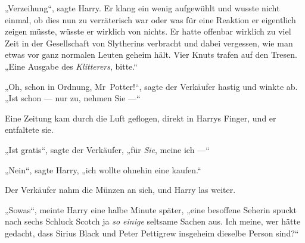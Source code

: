 „Verzeihung“, sagte Harry. Er klang ein wenig aufgewühlt und wusste nicht einmal, ob dies nun zu verräterisch war oder was für eine Reaktion er eigentlich zeigen müsste, wüsste er wirklich von nichts. Er hatte offenbar wirklich zu viel Zeit in der Gesellschaft von Slytherins verbracht und dabei vergessen, wie man etwas vor ganz normalen Leuten geheim hält. Vier Knuts trafen auf den Tresen.
„Eine Ausgabe des \emph{Klitterers}, bitte.“

„Oh, schon in Ordnung, Mr~Potter!“, sagte der Verkäufer hastig und winkte ab.
„Ist schon — nur zu, nehmen Sie —“

Eine Zeitung kam durch die Luft geflogen, direkt in Harrys Finger, und er entfaltete sie.


„Ist gratis“, sagte der Verkäufer, „für \emph{Sie}, meine ich —“

„Nein“, sagte Harry, „ich wollte ohnehin eine kaufen.“

Der Verkäufer nahm die Münzen an sich, und Harry las weiter.

„Sowas“, meinte Harry eine halbe Minute später, „eine besoffene Seherin spuckt nach sechs Schluck Scotch ja \emph{so einige} seltsame Sachen aus. Ich meine, wer hätte gedacht, dass Sirius Black und Peter Pettigrew insgeheim dieselbe Person sind?“


